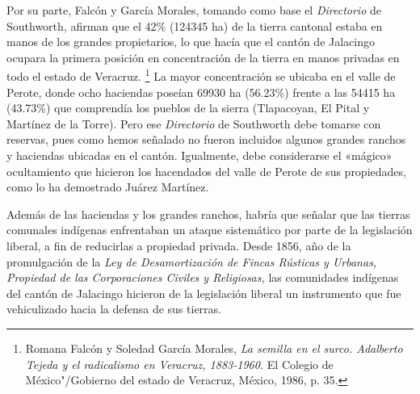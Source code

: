 \documentclass[14pt,twoside,final]{extbook} %
\let\oldfootnote\footnote
\renewcommand\footnote[1]{%
\oldfootnote{\hspace{1mm}#1}}
\begin{document}
Por su parte, Falcón y García Morales, tomando como base el \emph{Directorio} de Southworth, afirman que el 42\% (124345 ha) de la tierra cantonal estaba en manos de los grandes propietarios, lo que hacía que el cantón de Jalacingo ocupara la primera posición en concentración de la tierra en manos privadas en todo el estado de Veracruz.\footnote{Romana Falcón y Soledad García Morales, \emph{La semilla en el surco. Adalberto Tejeda y el radicalismo en Veracruz, 1883-1960.} El Colegio de México"/Gobierno del estado de Veracruz, México, 1986, p. 35.} La mayor concentración se ubicaba en el valle de Perote, donde ocho haciendas poseían 69930 ha (56.23\%) frente a las 54415 ha (43.73\%) que comprendía los pueblos de la sierra (Tlapacoyan, El Pital y Martínez de la Torre). Pero ese \emph{Directorio} de Southworth debe tomarse con reservas, pues como hemos señalado no fueron incluidos algunos grandes ranchos y haciendas ubicadas en el cantón. Igualmente, debe considerarse el «mágico» ocultamiento que hicieron los hacendados del valle de Perote de sus propiedades, como lo ha demostrado Juárez Martínez.

Además de las haciendas y los grandes ranchos, habría que señalar que las tierras comunales indígenas enfrentaban un ataque sistemático por parte de la legislación liberal, a fin de reducirlas a propiedad privada. Desde 1856, año de la promulgación de la \emph{Ley de Desamortización de Fincas Rústicas y Urbanas, Propiedad de las Corporaciones Civiles y Religiosas,} las comunidades indígenas del cantón de Jalacingo hicieron de la legislación liberal un instrumento que fue vehiculizado hacia la defensa de sus tierras.
\end{document}
